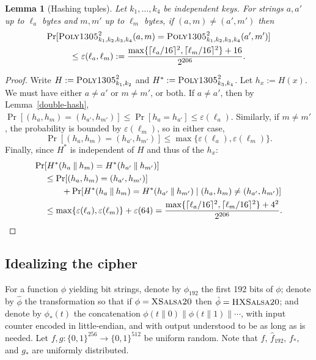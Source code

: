 \documentclass{article}
\newtheorem{lemma}{Lemma}
\def\operatorsc#1{{%
  \ifmmode\let\next=\operatorname\else\let\next=\relax\fi\next{\textsc{#1}}}}
\def\XSalsa#1/{\operatorsc{XSalsa#1}}
\def\HXSalsa#1/{\operatorsc{HXSalsa#1}}
\def\Poly#1/{\operatorsc{Poly#1}}
\newcommand{\concat}{\mathbin\|}
\newcommand{\given}{\mathrel|}
\newcommand{\collisionbound}{\varepsilon}
\begin{document}
\begin{lemma}[Hashing tuples]\label{hash-tuple}
  Let $k_1, \dotsc, k_4$ be independent \Poly1305/ keys.
  For strings $a, a'$ up to $\ell_a$ bytes and $m, m'$ up to $\ell_m$
   bytes, if $(a, m) \ne (a', m')$ then
%
  \begin{multline*}
    \Pr[\Poly1305/^2_{k_1,k_2,k_3,k_4}(a, m)
        = \Poly1305/^2_{k_1,k_2,k_3,k_4}(a', m')] \\
    \leq \collisionbound(\ell_a, \ell_m)
    := \frac{\max\{\lceil\ell_a/16\rceil^2, \lceil\ell_m/16\rceil^2\}
             + 16}
            {2^{206}}.
  \end{multline*}
\end{lemma}

\begin{proof}
  Write
   $H := \Poly1305/^2_{k_1,k_2}$ and
   $H^* := \Poly1305/^2_{k_3,k_4}$.
  Let $h_x := H(x)$.
  We must have either $a \ne a'$ or $m \ne m'$, or both.
  If $a \ne a'$, then by Lemma~\ref{double-hash},
   $\Pr[(h_a, h_m) = (h_{a'}, h_{m'})]
    \leq \Pr[h_a = h_{a'}]
    \leq \collisionbound(\ell_a)$.
  Similarly, if $m \ne m'$, the probability is bounded by
   $\collisionbound(\ell_m)$,
   so in either case,
  \[
    \Pr[(h_a, h_m) = (h_{a'}, h_{m'})]
    \leq \max\{\collisionbound(\ell_a), \collisionbound(\ell_m)\}.
  \]
  Finally, since $H^*$ is independent of $H$ and thus of the $h_x$:
%
  \begin{align*}
    \Pr&[H^*(h_a \concat h_m) = H^*(h_{a'} \concat h_{m'})] \\
    &\leq \Pr[(h_a, h_m) = (h_{a'}, h_{m'})] \\
    &\qquad
          + \Pr[H^*(h_a \concat h_m) = H^*(h_{a'} \concat h_{m'})
                \given (h_a, h_m) \ne (h_{a'}, h_{m'})] \\
    &\leq \max\{\collisionbound(\ell_a), \collisionbound(\ell_m)\}
          + \collisionbound(64)
     = \frac{\max\{\lceil\ell_a/16\rceil^2, \lceil\ell_m/16\rceil^2\}
             + 4^2}
            {2^{206}}.
    \qedhere
  \end{align*}
\end{proof}

\subsection{Idealizing the cipher}

For a function $\phi$ yielding bit strings, denote by $\phi_{192}$ the
 first 192 bits of $\phi$; denote by $\hat\phi$ the transformation so
 that if $\phi = \XSalsa20/$ then $\hat\phi = \HXSalsa20/$; and denote
 by $\phi_*(t)$ the concatenation
 $\phi(t \concat 0) \concat \phi(t \concat 1) \concat \dotsb$,
 with input counter encoded in little-endian, and with output
 understood to be as long as is needed.
Let $f,g\colon \{0,1\}^{256} \to \{0,1\}^{512}$ be uniform random.
Note that $\hat f$, $\hat f_{192}$, $f_*$, and $g_*$ are uniformly
 distributed.
\end{document}
